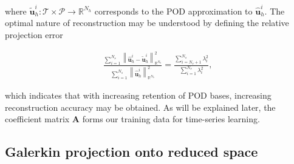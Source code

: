 \documentclass[preprint,12pt]{elsarticle}
\begin{document}
where $\tilde{\mathbf{u}}_h^i : \mathcal{T} \times \mathcal{P} \rightarrow \mathbb{R}^{N_h}$ corresponds to the POD approximation to $\hat{\mathbf{u}}_h^i$. The optimal nature of reconstruction may be understood by defining the relative projection error
\begin{linenomath*}
\begin{align}
\frac{\sum_{i=1}^{N_{s}}\left\|\hat{\mathbf{u}}^i_h-\tilde{\mathbf{u}}^i_h \right\|_{\mathbb{R}^{N_{h}}}^{2}}{\sum_{i=1}^{N_{s}}\left\|\hat{\mathbf{u}}^i_h\right\|_{\mathbb{R}^{N_{h}}}^{2}}=\frac{\sum_{i=N_r+1}^{N_{s}} \lambda_{i}^{2}}{\sum_{i=1}^{N_{s}} \lambda_{i}^{2}},
\end{align}
\end{linenomath*}
which indicates that with increasing retention of POD bases, increasing reconstruction accuracy may be obtained. As will be explained later, the coefficient matrix $\mathbf{A}$ forms our training data for time-series learning.

\subsection{Galerkin projection onto reduced space}
\end{document}
